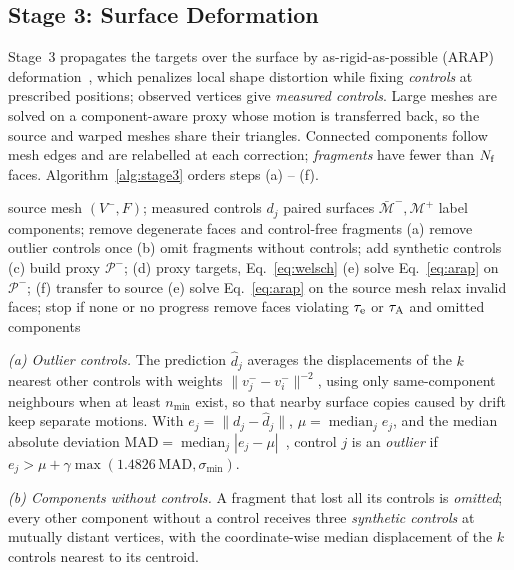 \subsection{Stage 3: Surface Deformation}
\label{sec:stage3}

Stage~3 propagates the targets over the surface by as-rigid-as-possible
(ARAP) deformation~\cite{ARAP_modeling:2007}, which penalizes local shape
distortion while fixing \emph{controls} at prescribed positions; observed
vertices give \emph{measured controls}. Large meshes are solved on a
component-aware proxy whose motion is transferred back, so the source and
warped meshes share their triangles. Connected components follow mesh edges
and are relabelled at each correction; \emph{fragments} have fewer than
$N_{\rm f}$ faces. Algorithm~\ref{alg:stage3} orders steps (a) -- (f).

\begin{algorithm}[t]
\caption{Stage~3 of one correction}
\label{alg:stage3}
\footnotesize
\begin{algorithmic}[1]
\Require source mesh $(V^-,F)$; measured controls $d_j$
\Ensure paired surfaces $\bar{\mathcal M}^-,\mathcal M^+$
\State label components; remove degenerate faces and control-free fragments
\State (a) remove outlier controls once
\State (b) omit fragments without controls; add synthetic controls
  \State (c) build proxy $\mathcal P^-$; (d) proxy targets, Eq.~\eqref{eq:welsch}
  \State (e) solve Eq.~\eqref{eq:arap} on $\mathcal P^-$; (f) transfer to source
\Else
  \State (e) solve Eq.~\eqref{eq:arap} on the source mesh
\EndIf
{} 
  \State relax invalid faces; stop if none or no progress
\EndFor
\State remove faces violating $\tau_{\rm e}$ or $\tau_{\rm A}$ and omitted components
\end{algorithmic}
\end{algorithm}

\textit{(a) Outlier controls.}
The prediction $\hat d_j$ averages the displacements of the $k$ nearest other
controls with weights $\|v_j^--v_i^-\|^{-2}$, using only same-component
neighbours when at least $n_{\min}$ exist, so that nearby surface copies
caused by drift keep separate motions. With $e_j=\|d_j-\hat d_j\|$,
$\mu=\operatorname{median}_je_j$, and the median absolute deviation
$\mathrm{MAD}=\operatorname{median}_j|e_j-\mu|$~\cite{rousseeuw1993mad},
control $j$ is an \emph{outlier} if
$e_j>\mu+\gamma\max(1.4826\,\mathrm{MAD},\sigma_{\min})$.

\textit{(b) Components without controls.}
A fragment that lost all its controls is \emph{omitted}; every other
component without a control receives three \emph{synthetic controls} at
mutually distant vertices, with the coordinate-wise median displacement of
the $k$ controls nearest to its centroid.

